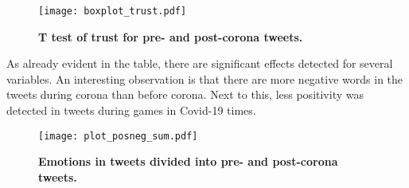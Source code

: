 \documentclass[12pt]{article}
\begin{document}
\begin{figure}[H]
\caption{\textbf{T test of trust for pre- and post-corona tweets.}}
\texttt{[image: boxplot\_trust.pdf]}

\end{figure}
As already evident in the table, there are significant effects detected for several variables. An interesting observation is that there are more negative words in the tweets during corona than before corona. Next to this, less positivity was detected in tweets during games in Covid-19 times.

\begin{figure}[H]
\caption{\textbf{Emotions in tweets divided into pre- and post-corona tweets.}}
\texttt{[image: plot\_posneg\_sum.pdf]}

\end{figure}

\nocite{*}

\end{document}
